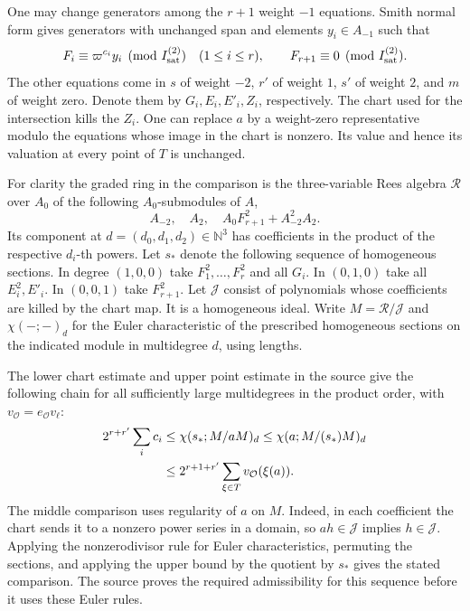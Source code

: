 One may change generators among the \(r+1\) weight \(-1\) equations.
Smith normal form gives generators with unchanged span and elements
\(y_i\in A_{-1}\) such that
\[
  F_i\equiv\varpi^{c_i}y_i\pmod{I^{(2)}_{\rm sat}}
     \quad(1\le i\le r),\qquad
  F_{r+1}\equiv0\pmod{I^{(2)}_{\rm sat}} .
\]
The other equations come in \(s\) of weight \(-2\), \(r'\) of weight
\(1\), \(s'\) of weight \(2\), and \(m\) of weight zero. Denote them
by \(G_i,E_i,E'_i,Z_i\), respectively. The chart used for the
intersection kills the \(Z_i\). One can replace \(a\) by a
weight-zero representative modulo the equations whose image in the
chart is nonzero. Its value and hence its valuation at every point
of \(T\) is unchanged.

For clarity the graded ring in the comparison is the three-variable
Rees algebra \(\mathcal R\) over \(A_0\) of the following
\(A_0\)-submodules of \(A\),
\[
    A_{-2},\quad A_2,\quad A_0F_{r+1}^2+A_{-2}^2 A_2.
\]
Its component at \(d=(d_0,d_1,d_2)\in\mathbb N^3\) has coefficients
in the product of the respective \(d_i\)-th powers. Let \(s_*\)
denote the following sequence of homogeneous sections. In degree
\((1,0,0)\) take \(F_1^2,\ldots,F_r^2\) and all \(G_i\). In
\((0,1,0)\) take all \(E_i^2,E'_i\). In \((0,0,1)\) take
\(F_{r+1}^2\). Let \(\mathcal J\) consist of polynomials whose
coefficients are killed by the chart map. It is a homogeneous
ideal. Write \(M=\mathcal R/\mathcal J\) and \(\chi(-;-)_d\)
for the Euler characteristic of the prescribed homogeneous sections
on the indicated module in multidegree \(d\), using lengths.

The lower chart estimate and upper point estimate in the source
give the following chain for all sufficiently large multidegrees
in the product order, with \(v_{\mathcal O}=e_{\mathcal O}v_\ell\):
\begin{align}
  2^{r+r'}\sum_i c_i
       &\le \chi(s_*;M/aM)_d
        \le \chi(a;M/(s_*)M)_d \notag\\
       &\le 2^{r+1+r'}\sum_{\xi\in T}v_{\mathcal O}(\xi(a)).
       \label{eq:single-rees}
\end{align}
The middle comparison uses regularity of \(a\) on \(M\). Indeed, in
each coefficient the chart sends it to a nonzero power series in a
domain, so \(a h\in\mathcal J\) implies \(h\in\mathcal J\). Applying
the nonzerodivisor rule for Euler characteristics, permuting the
sections, and applying the upper bound by the quotient by \(s_*\)
gives the stated comparison. The source proves the required
admissibility for this sequence before it uses these Euler rules.

